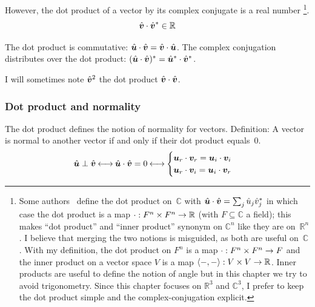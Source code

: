 However, the dot product of a vector by its complex conjugate is a real number%
\footnote{
    Some authors~\parencite[][for example]{lipschutz2009linear} define the dot product on~$\mathbb{C}$ with $\hat{\bm{u}} \cdot \hat{\bm{v}} = \sum_j \hat{u}_j \hat{v}^*_j$
    in which case the dot product is a map
    $\cdot : F^n \times F^n \to \mathbb{R}$ (with $F \subseteq \mathbb{C}$ a field);
    this makes ``dot product'' and ``inner product'' synonym on $\mathbb{C}^n$ like they are on~$\mathbb{R}^n$.
    I believe that merging the two notions is misguided, as both are useful on~$\mathbb{C}$.
    With my definition,
    the dot product on $F^n$ is a map $\cdot : F^n \times F^n \to F$
    and the inner product on a vector space $V$ is a map $\langle -, - \rangle : V \times V \to \mathbb{R}$.
    Inner products are useful to define the notion of angle but in this chapter we try to avoid trigonometry.
    Since this chapter focuses on $\mathbb{R}^3$ and $\mathbb{C}^3$, I prefer to keep the dot product simple and the complex-conjugation explicit.
}.
\begin{equation}
    \hat{\bm{v}} \cdot \hat{\bm{v}}^* \in \mathbb{R}
\end{equation}

The dot product is commutative:
$\hat{\bm{u}} \cdot \hat{\bm{v}} = \hat{\bm{v}} \cdot \hat{\bm{u}}$.
The complex conjugation distributes over the dot product:
$(\hat{\bm{u}} \cdot \hat{\bm{v}})^* = \hat{\bm{u}}^* \cdot \hat{\bm{v}}^*$.

I will sometimes note $\hat{\bm{v}}^2$ the dot product $\hat{\bm{v}} \cdot \hat{\bm{v}}$.

\subsubsection{Dot product and normality}

The dot product defines the notion of normality for vectors.
Definition: A vector is normal to another vector if and only if their dot product equals~$0$.
\begin{equation}
    \hat{\bm{u}} \perp \hat{\bm{v}}
    \mathbin{\longleftrightarrow}
    \hat{\bm{u}} \cdot \hat{\bm{v}} = 0
    \mathbin{\longleftrightarrow}
    \begin{cases}
        \bm{u}_r \cdot \bm{v}_r = \bm{u}_i \cdot \bm{v}_i \\
        \bm{u}_r \cdot \bm{v}_i = \bm{u}_i \cdot \bm{v}_r
    \end{cases}
    \label{eq:dot_perp}
\end{equation}

